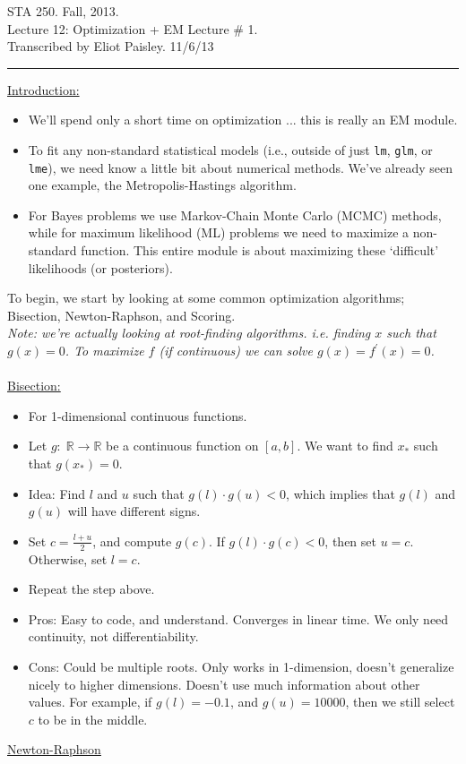 \documentclass[a4paper, 10pt]{article}
\begin{document}
\begin{center}
\huge STA 250. Fall, 2013. \\ 
\Large Lecture 12: Optimization + EM Lecture $\#$ 1.\\ \small Transcribed by Eliot Paisley. 11/6/13
\end{center}
\hrule 
\normalsize 
\vspace{0.5in}

\underline{Introduction:}
\begin{itemize}
	\item We'll spend only a short time on optimization ... this is really an EM module. 
	\item To fit any non-standard statistical models (i.e., outside of just \texttt{lm}, \texttt{glm}, or \texttt{lme}), we need know a little bit about numerical methods. We've already seen one example, the Metropolis-Hastings algorithm. 
	\item For Bayes problems we use Markov-Chain Monte Carlo (MCMC) methods, while for maximum likelihood (ML) problems we need to maximize a non-standard function. This entire module is about maximizing these `difficult' likelihoods (or posteriors). 
\end{itemize}
To begin, we start by looking at some common optimization algorithms; Bisection, Newton-Raphson, and Scoring. \\
\emph{Note: we're actually looking at root-finding algorithms. i.e. finding $x$ such that $g(x)=0$. To maximize $f$ (if continuous) we can solve $g(x) = f^\prime (x)=0$.} \\ \\

\underline{Bisection:}
\begin{itemize}
	\item For 1-dimensional continuous functions.
	\item Let $g:\;\mathbb{R} \rightarrow \mathbb{R}$ be a continuous function on $[a,b]$. We want to find $x_*$ such that $g(x_*)=0$.
	\item Idea: Find $l$ and $u$ such that $g(l)\cdot g(u) <0$, which implies that $g(l)$ and $g(u)$ will have different signs. 
	\item Set $c = \frac{l+u}{2}$, and compute $g(c)$. If $g(l)\cdot g(c) <0$, then set $u=c$. Otherwise, set $l=c$. 
	\item Repeat the step above. 
	\item Pros: Easy to code, and understand. Converges in linear time. We only need continuity, not differentiability. 
	\item Cons: Could be multiple roots. Only works in 1-dimension, doesn't generalize nicely to higher dimensions. Doesn't use much information about other values. For example, if $g(l)=-0.1$, and $g(u)=10000$, then we still select $c$ to be in the middle. 
\end{itemize}
\vspace{0.3in} 
\underline{Newton-Raphson}
\end{document}
